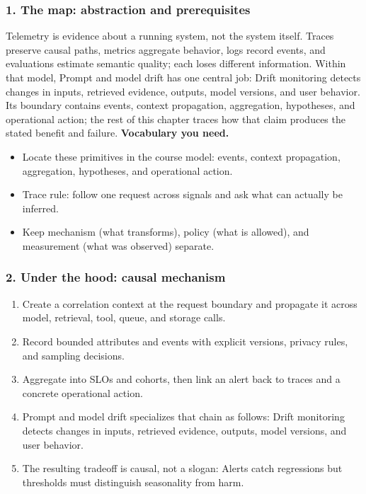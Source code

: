 \subsubsection*{1. The map: abstraction and prerequisites}
Telemetry is evidence about a running system, not the system itself. Traces preserve causal paths, metrics aggregate behavior, logs record events, and evaluations estimate semantic quality; each loses different information.
Within that model, Prompt and model drift has one central job: Drift monitoring detects changes in inputs, retrieved evidence, outputs, model versions, and user behavior. Its boundary contains events, context propagation, aggregation, hypotheses, and operational action; the rest of this chapter traces how that claim produces the stated benefit and failure.
\textbf{Vocabulary you need.}\begin{itemize}
\item Locate these primitives in the course model: events, context propagation, aggregation, hypotheses, and operational action.
\item Trace rule: follow one request across signals and ask what can actually be inferred.
\item Keep mechanism (what transforms), policy (what is allowed), and measurement (what was observed) separate.
\end{itemize}
\subsubsection*{2. Under the hood: causal mechanism}\begin{enumerate}
\item Create a correlation context at the request boundary and propagate it across model, retrieval, tool, queue, and storage calls.
\item Record bounded attributes and events with explicit versions, privacy rules, and sampling decisions.
\item Aggregate into SLOs and cohorts, then link an alert back to traces and a concrete operational action.
\item Prompt and model drift specializes that chain as follows: Drift monitoring detects changes in inputs, retrieved evidence, outputs, model versions, and user behavior.
\item The resulting tradeoff is causal, not a slogan: Alerts catch regressions but thresholds must distinguish seasonality from harm.
\end{enumerate}
